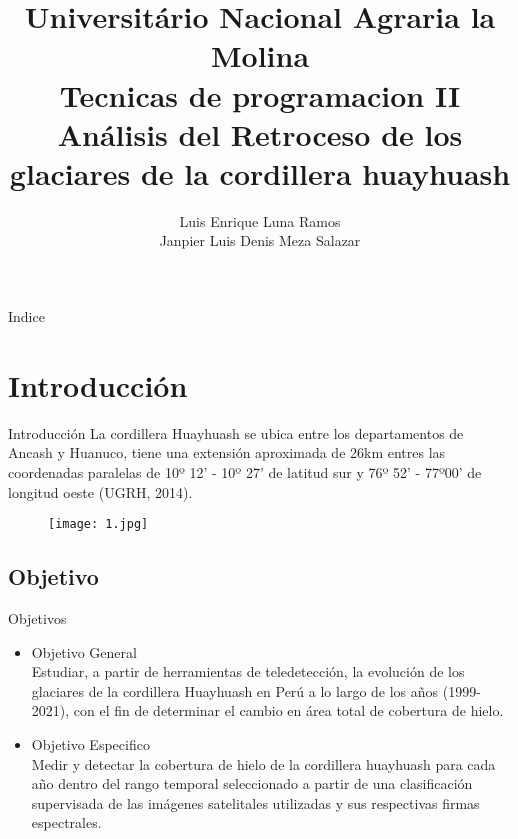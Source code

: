 \documentclass[handout,t]{beamer}
\title[Análisis del Retroceso de los glaciares de la cordillera huayhuash]{Universitário Nacional Agraria la Molina\\Tecnicas de programacion II\\Análisis del Retroceso de los glaciares de la cordillera huayhuash\\}
\date{}
\author[Trabajo Final - Tecnicad de Programación]{Luis Enrique Luna Ramos\\ Janpier Luis Denis Meza Salazar\\}
\begin{document}

\frame{\titlepage}
\section[]{}
\begin{frame}{Indice}
  \tableofcontents
\end{frame}


\section{Introducción}
\begin{frame}{Introducción}
La cordillera Huayhuash se ubica entre los departamentos de Ancash y Huanuco, tiene una extensión aproximada de 26km entres las coordenadas paralelas de 10º 12’ - 10º 27’ de latitud sur y 76º 52’ - 77º00’ de longitud oeste (UGRH, 2014).
\begin{figure}
  \centering
  \texttt{[image: 1.jpg]}
\end{figure}
\end{frame}

\subsection{Objetivo}
\begin{frame}{Objetivos}
  \begin{itemize}
    \item Objetivo General \\ Estudiar, a partir de herramientas de teledetección, la evolución de los glaciares de la cordillera Huayhuash en Perú a lo largo de los años (1999-2021), con el fin de determinar el cambio en área total de cobertura de hielo.\\
    
    \item Objetivo Especifico \\ Medir y detectar la cobertura de hielo de la cordillera huayhuash para cada año dentro del rango temporal seleccionado a partir de una clasificación supervisada de las imágenes satelitales utilizadas y sus respectivas firmas espectrales. \\
  \end{itemize}
  
\end{frame}
\end{document}
